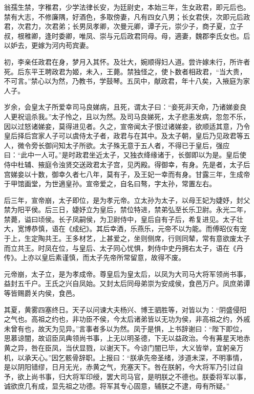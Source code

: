 \documentclass[]{article}
\begin{document}
翁孺生禁，字稚君，少学法律长安，为廷尉史，本始三年，生女政君，即元后也。禁有大志，不修廉隅，好酒色，多取傍妻，凡有四女八男；长女君侠，次即元后政君，次君力，次君弟；长男凤孝卿，次曼元卿，谭子元，崇少子，商子夏，立子叔，根稚卿，逢时委卿，唯凤、崇与元后政君同母。母，適妻，魏郡李氏女也。后以妒去，更嫁为河内苟宾妻。

初，李亲任政君在身，梦月入其怀。及壮大，婉顺得妇人道。尝许嫁未行，所许者死。后东平王聘政君为姬，未入，王薨。禁独怪之，使卜数者相政君，``当大贵，不可言。''禁心以为然，乃教书，学鼓琴。五凤中，献政君，年十八矣，入掖庭为家人子。

岁余，会皇太子所爱幸司马良娣病，且死，谓太子曰：``妾死非天命，乃诸娣妾良人更祝诅杀我。''太子怜之，且以为然。及司马良娣死，太子悲恚发病，忽忽不乐，因以过怒诸娣妾，莫得进见者。久之，宣帝闻太子恨过诸娣妾，欲顺适其意，乃令皇后择后宫家人子可以虞侍太子者，政君与在其中。及太子朝，皇后乃见政君等五人，微令旁长御问知太子所欲。太子殊无意于五人者，不得已于皇后，强应曰：``此中一人可。''是时政君坐近太子，又独衣绛缘诸于，长御即以为是。皇后使侍中杜辅、掖庭令浊贤交送政君太子宫，见丙殿。得御幸，有身。先是者，太子后宫娣妾以十数，御幸久者七八年，莫有子，及王妃一幸而有身。甘露三年，生成帝于甲馆画堂，为世適皇孙。宣帝爱之，自名曰骜，字太孙，常置左右。

后三年，宣帝崩，太子即位，是为孝元帝。立太孙为太子，以母王妃为婕妤，封父禁为阳平侯。后三日，婕妤立为皇后，禁位特进，禁弟弘至长乐卫尉。永光二年，禁薨，谥曰顷侯。长子凤嗣侯，为卫尉侍中，皇后自有子后，希复进见。太子壮大，宽博恭慎，语在《成纪》。其后幸酒，乐燕乐，元帝不以为能。而傅昭仪有宠于上，生定陶共王。王多材艺，上甚爱之，坐则侧席，行则同辇，常有意欲废太子而立共王。时凤在位，与皇后、太子同心忧惧，刺侍中史丹拥右太子，语在《丹传》。上亦以皇后素谨慎，而太子先帝所常留意，故得不废。

元帝崩，太子立，是为孝成帝。尊皇后为皇太后，以凤为大司马大将军领尚书事，益封五千户。王氏之兴自凤始。又封太后同母弟崇为安成侯，食邑万户。凤庶弟谭等皆赐爵关内侯，食邑。

其夏，黄雾四塞终日。天子以问谏大夫杨兴、博王驷胜等，对皆以为：``阴盛侵阳之气也。高祖之约也，非功臣不侯，今太后诸弟皆以无功为侯，非高祖之约，外戚未曾有也，故天为见异。''言事者多以为然。凤于是惧，上书辞谢曰：``陛下即位，思慕谅闇，故诏臣凤典领尚书事，上无以明圣德，下无以益政治。今有茀星天地赤黄之异，咎在臣凤，当伏显戮，以谢天下。今谅门闇已毕，大义皆举，宜躬亲万机，以承天心。''因乞骸骨辞职。上报曰：``朕承先帝圣绪，涉道未深，不明事情，是以阴阳错缪，日月无光，赤黄之气，充塞天下。咎在朕躬，今大将军乃引过自予，欲上尚书事，归大将军印绶，罢大司马官，是明朕之不德也。朕委将军以事，诚欲庶几有成，显先祖之功德。将军其专心固意，辅朕之不逮，毋有所疑。''
\end{document}
